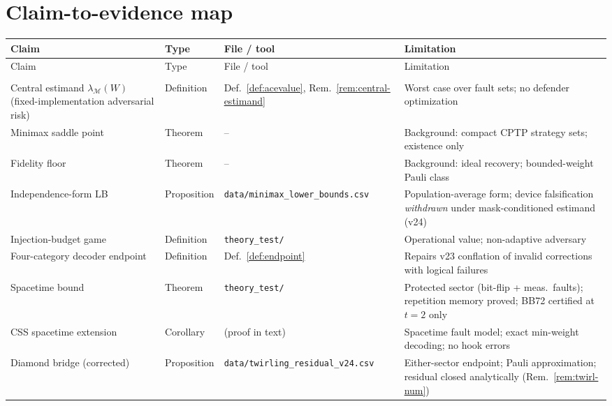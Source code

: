 \documentclass[11pt,a4paper]{article}
\begin{document}
\section*{Claim-to-evidence map}
\begingroup\scriptsize
\setlength{\tabcolsep}{3pt}
\renewcommand{\arraystretch}{1.08}
\begin{longtable}{@{}>{\raggedright\arraybackslash}p{3.4cm}>{\raggedright\arraybackslash}p{1.6cm}>{\raggedright\arraybackslash}p{4.6cm}>{\raggedright\arraybackslash}p{4.4cm}@{}}
\toprule Claim & Type & File / tool & Limitation \\\midrule
\endfirsthead
\toprule Claim & Type & File / tool & Limitation \\\midrule
\endhead
\multicolumn{4}{r}{\scriptsize\itshape continued on next page}\\
\endfoot
\bottomrule
\endlastfoot
Central estimand $\lambda_{\mathcal{M}}(W)$ (fixed-implementation adversarial risk) & Definition & Def.~\ref{def:acevalue}, Rem.~\ref{rem:central-estimand} & Worst case over fault sets; no defender optimization \\
Minimax saddle point & Theorem & -- & Background: compact CPTP strategy sets; existence only \\
Fidelity floor & Theorem & -- & Background: ideal recovery; bounded-weight Pauli class \\
Independence-form LB & Proposition & \texttt{data/\allowbreak minimax\_\allowbreak lower\_\allowbreak bounds.csv} & Population-average form; device falsification \emph{withdrawn} under mask-conditioned estimand (v24) \\
Injection-budget game & Definition & \texttt{theory\_\allowbreak test/\allowbreak } & Operational value; non-adaptive adversary \\
Four-category decoder endpoint & Definition & Def.~\ref{def:endpoint} & Repairs v23 conflation of invalid corrections with logical failures \\
Spacetime bound & Theorem & \texttt{theory\_\allowbreak test/\allowbreak } & Protected sector (bit-flip + meas.\ faults); repetition memory proved; BB72 certified at $t{=}2$ only \\
CSS spacetime extension & Corollary & (proof in text) & Spacetime fault model; exact min-weight decoding; no hook errors \\
Diamond bridge (corrected) & Proposition & \texttt{data/\allowbreak twirling\_\allowbreak residual\_\allowbreak v24.csv} & Either-sector endpoint; Pauli approximation; residual closed analytically (Rem.~\ref{rem:twirl-num}) \\

\end{longtable}
\end{document}
